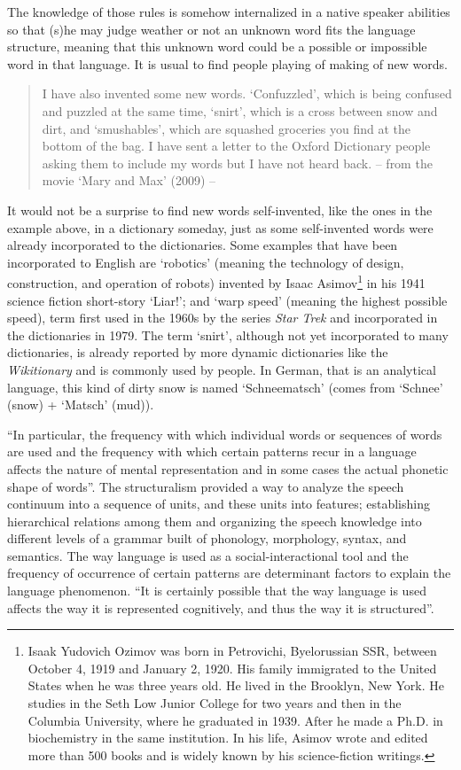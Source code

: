 The knowledge of those rules is somehow internalized in a native speaker abilities so that (s)he may judge weather or not an unknown word fits the language structure, meaning that this unknown word could be a possible or impossible word in that language. It is usual to find people playing of making of new words. 
\begin{quote}
I have also invented some new words. `Confuzzled', which is being confused and puzzled at the same time, `snirt', which is a cross between snow and dirt, and `smushables', which are squashed groceries you find at the bottom of the bag. I have sent a letter to the Oxford Dictionary people asking them to include my words but I have not heard back. -- from the movie `Mary and Max' (2009) --
\end{quote}
It would not be a surprise to find new words self-invented, like the ones in the example above, in a dictionary someday, just as some self-invented words were already incorporated to the dictionaries. Some examples that have been incorporated to English are `robotics' (meaning the technology of design, construction, and operation of robots) invented by Isaac Asimov\footnote{Isaak Yudovich Ozimov was born in Petrovichi, Byelorussian SSR, between October 4, 1919 and January 2, 1920. His family immigrated to the United States when he was three years old. He lived in the Brooklyn, New York. He studies in the Seth Low Junior College for two years and then in the Columbia University, where he graduated in 1939. After he made a Ph.D. in biochemistry in the same institution. In his life, Asimov wrote and edited more than 500 books and is widely known by his science-fiction writings.} in his 1941 science fiction short-story `Liar!'; and `warp speed' (meaning the highest possible speed), term first used in the 1960s by the series \textit{Star Trek} and incorporated in the dictionaries in 1979. The term `snirt', although not yet incorporated to many dictionaries, is already reported by more dynamic dictionaries like the \textit{Wikitionary} and is commonly used by people. In German, that is an analytical language, this kind of dirty snow is named `Schneematsch' (comes from `Schnee' (snow) + `Matsch' (mud)).
 
``In particular, the frequency with which individual words or sequences of words are used and the frequency with which certain patterns recur in a language affects the nature of mental representation and in some cases the actual phonetic shape of words''\citep{bybee2003}. The structuralism provided a way to analyze the speech continuum into a sequence of units, and these units into features; establishing hierarchical relations among them and organizing the speech knowledge into different levels of a grammar built of phonology, morphology, syntax, and semantics. The way language is used as a social-interactional tool and the frequency of occurrence of certain patterns are determinant factors to explain the language phenomenon. ``It is certainly possible that the way language is used affects the way it is represented cognitively, and thus the way it is structured''\citep{bybee2003}.

